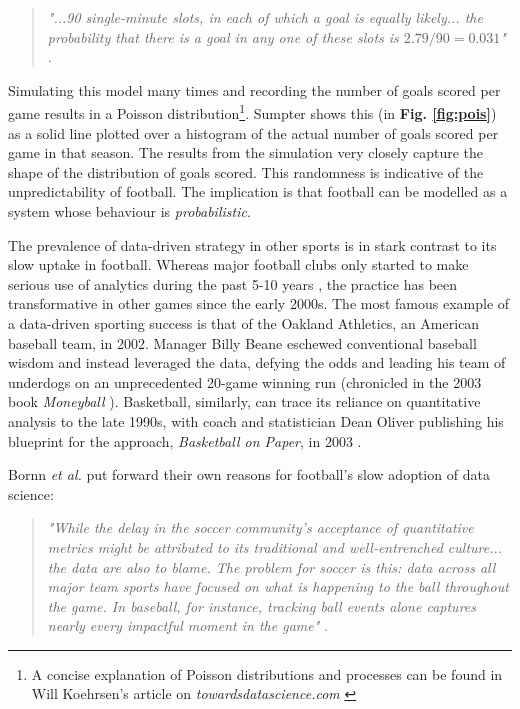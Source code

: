 \documentclass{l4proj}
\begin{document}
\begin{quote}
    \textit{"...90 single-minute slots, in each of which a goal is equally likely... the probability that there is a goal in any one of these slots is $2.79/90 = 0.031$"} \cite{sump1}. 
\end{quote} 

Simulating this model many times and recording the number of goals scored per game results in a Poisson distribution\footnote{A concise explanation of Poisson distributions and processes can be found in Will Koehrsen's article on \textit{towardsdatascience.com} \cite{koe1}}. Sumpter shows this (in \textbf{Fig. \ref{fig:pois}}) as a solid line plotted over a histogram of the actual number of goals scored per game in that season. The results from the simulation very closely capture the shape of the distribution of goals scored. This randomness is indicative of the unpredictability of football. The implication is that football can be modelled as a system whose behaviour is \textit{probabilistic}.

The prevalence of data-driven strategy in other sports is in stark contrast to its slow uptake in football. Whereas major football clubs only started to make serious use of analytics during the past 5-10 years \cite{fcb2, guar1}, the practice has been transformative in other games since the early 2000s. The most famous example of a data-driven sporting success is that of the Oakland Athletics, an American baseball team, in 2002. Manager Billy Beane eschewed conventional baseball wisdom and instead leveraged the data, defying the odds and leading his team of underdogs on an unprecedented 20-game winning run (chronicled in the 2003 book \textit{Moneyball} \cite{mbal1}). Basketball, similarly, can trace its reliance on quantitative analysis to the late 1990s, with coach and statistician Dean Oliver publishing his blueprint for the approach, \textit{Basketball on Paper}, in 2003 \cite{bbop1}. 

Bornn \textit{et al.} put forward their own reasons for football's slow adoption of data science:

\begin{quote}
    \textit{"While the delay in the soccer community's acceptance of quantitative metrics might be attributed to its traditional and well‐entrenched culture... the data are also to blame. The problem for soccer is this: data across all major team sports have focused on what is happening to the ball throughout the game. In baseball, for instance, tracking ball events alone captures nearly every impactful moment in the game"} \cite{bornn1}.
\end{quote}
\end{document}
